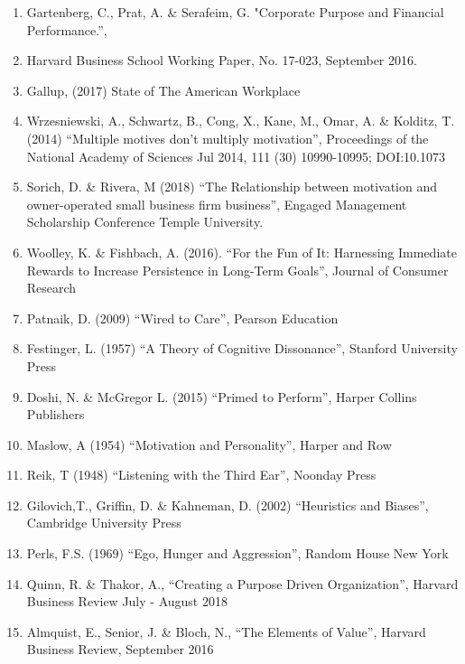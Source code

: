 \documentclass[14pt]{extreport}
\begin{document}
\begin{enumerate}
	\item Gartenberg, C., Prat, A. \& Serafeim, G. "Corporate Purpose and Financial Performance.”,
	\item Harvard Business School Working Paper, No. 17-023, September 2016.
	\item Gallup, (2017) State of The American Workplace
	\item Wrzesniewski, A., Schwartz, B., Cong, X., Kane, M., Omar, A. \& Kolditz, T. (2014) “Multiple motives don’t multiply motivation”, Proceedings of the National Academy of Sciences Jul 2014, 111 (30) 10990-10995; DOI:10.1073
	\item Sorich, D. \& Rivera, M (2018) “The Relationship between motivation and owner-operated small business firm business”, Engaged Management Scholarship Conference Temple University.
	\item Woolley, K. \& Fishbach, A. (2016). “For the Fun of It: Harnessing Immediate Rewards to Increase Persistence in Long-Term Goals”, Journal of Consumer Research
	\item Patnaik, D. (2009) “Wired to Care”, Pearson Education
	\item Festinger, L. (1957) “A Theory of Cognitive Dissonance”, Stanford University Press
	\item Doshi, N. \& McGregor L. (2015) “Primed to Perform”, Harper Collins Publishers
	\item Maslow, A (1954) “Motivation and Personality”, Harper and Row
	\item Reik, T (1948) “Listening with the Third Ear”, Noonday Press
	\item Gilovich,T., Griffin, D. \& Kahneman, D. (2002) “Heuristics and Biases”, Cambridge University Press
	\item Perls, F.S. (1969) “Ego, Hunger and Aggression”, Random House New York
	\item Quinn, R. \& Thakor, A., “Creating a Purpose Driven Organization”, Harvard Business Review July - August 2018
	\item Almquist, E., Senior, J. \& Bloch, N., “The Elements of Value”, Harvard Business Review, September 2016
\end{enumerate}
\end{document}
